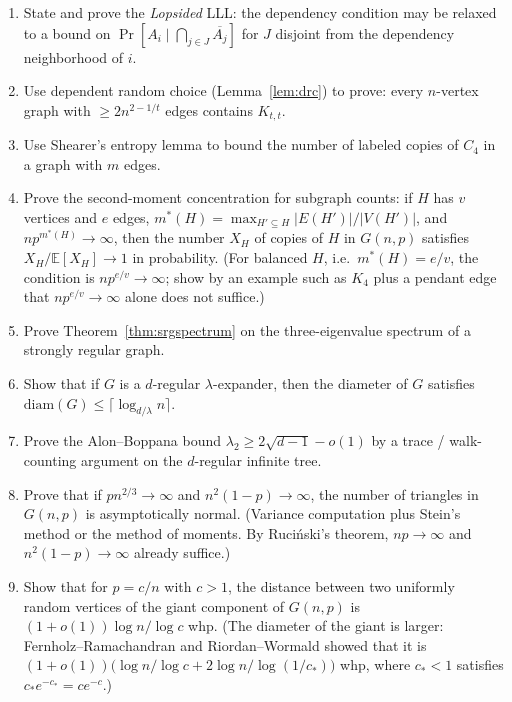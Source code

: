 \documentclass{article}
\theoremstyle{definition}
\begin{document}
\begin{enumerate}[resume]
\item State and prove the \emph{Lopsided} LLL: the dependency condition may
be relaxed to a bound on $\Pr[A_i \mid \bigcap_{j \in J} \overline{A_j}]$
for $J$ disjoint from the dependency neighborhood of $i$.

\item Use dependent random choice (Lemma~\ref{lem:drc}) to prove:
every $n$-vertex graph with $\ge 2n^{2 - 1/t}$ edges contains $K_{t, t}$.

\item Use Shearer's entropy lemma to bound the number of labeled copies
of $C_4$ in a graph with $m$ edges.

\item Prove the second-moment concentration for subgraph counts: if
$H$ has $v$ vertices and $e$ edges, $m^*(H) = \max_{H' \subseteq H} |E(H')|/|V(H')|$,
and $np^{m^*(H)} \to \infty$, then the number $X_H$ of copies of $H$ in
$G(n, p)$ satisfies $X_H/\mathbb{E}[X_H] \to 1$ in probability. (For
balanced $H$, i.e.\ $m^*(H) = e/v$, the condition is $np^{e/v} \to \infty$;
show by an example such as $K_4$ plus a pendant edge that
$np^{e/v} \to \infty$ alone does not suffice.)

\item Prove Theorem~\ref{thm:srgspectrum} on the three-eigenvalue spectrum
of a strongly regular graph.

\item Show that if $G$ is a $d$-regular $\lambda$-expander, then the
diameter of $G$ satisfies $\mathrm{diam}(G) \le \lceil \log_{d/\lambda} n \rceil$.

\item Prove the Alon--Boppana bound $\lambda_2 \ge 2\sqrt{d - 1} - o(1)$ by
a trace / walk-counting argument on the $d$-regular infinite tree.

\item Prove that if $p n^{2/3} \to \infty$ and $n^2(1 - p) \to \infty$, the
number of triangles in $G(n, p)$ is asymptotically normal. (Variance
computation plus Stein's method or the method of moments. By
Ruci\'nski's theorem, $np \to \infty$ and $n^2(1 - p) \to \infty$ already suffice.)

\item Show that for $p = c/n$ with $c > 1$, the distance between two uniformly
random vertices of the giant component of $G(n, p)$ is
$(1 + o(1))\log n / \log c$ whp. (The diameter of the giant is larger:
Fernholz--Ramachandran and Riordan--Wormald showed that it is
$(1 + o(1))\big(\log n/\log c + 2\log n/\log(1/c_*)\big)$ whp, where
$c_* < 1$ satisfies $c_* e^{-c_*} = c e^{-c}$.)


\end{enumerate}
\end{document}
